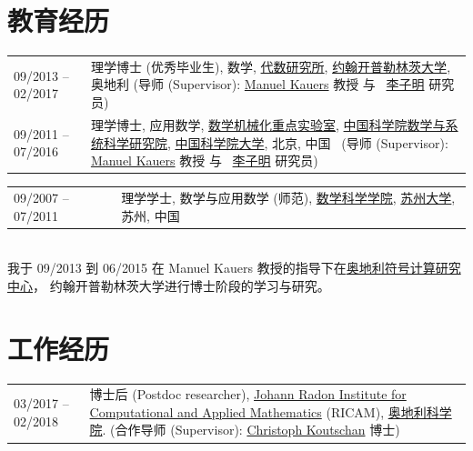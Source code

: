 \documentclass[a4paper,12pt]{article}
\begin{document}
\begin{CJK*}{UTF8}{gbsn}
\section*{\Large{教育经历}}

\vspace{.05in}
\begin{tabular}{@{}p{1.4in}p{4in}}
09/2013 -- 02/2017    & 理学博士 (优秀毕业生), 数学,  
                        \href{http://www.jku.at/algebra/content}{代数研究所}, 
                        \href{http://www.jku.at/content}{约翰开普勒林茨大学}, 奥地利 
                        (导师 (Supervisor): \href{http://www.kauers.de/}{Manuel Kauers} 教授 与  
                         \ \href{http://mmrc.iss.ac.cn/~zmli/}{李子明} 研究员)\\
09/2011 -- 07/2016    & 理学博士,  应用数学, 
                        \href{http://english.mmrc.amss.cas.cn/}{数学机械化重点实验室}, 
                        \href{http://www.amss.ac.cn/}{中国科学院数学与系统科学研究院}, 
                        \href{http://www.gucas.ac.cn/}{中国科学院大学}, 北京, 中国 
                        \ (导师 (Supervisor): \href{http://www.kauers.de/}{Manuel Kauers} 教授 与  
                         \ \href{http://mmrc.iss.ac.cn/~zmli/}{李子明} 研究员)\\
\end{tabular}
\begin{tabular}{@{}p{1.4in}p{4in}}
09/2007 -- 07/2011    & 理学学士, 数学与应用数学 (师范), \href{http://math.suda.edu.cn/}{数学科学学院}, 
                        \href{http://www.suda.edu.cn/}{苏州大学}, 苏州, 中国
\end{tabular} \\

\noindent 我于 09/2013 到 06/2015 在 Manuel Kauers 教授的指导下在\href{http://www.risc.jku.at/}{奥地利符号计算研究中心}， 
约翰开普勒林茨大学进行博士阶段的学习与研究。 

\section*{\Large{工作经历}}

\vspace{.05in}
\begin{tabular}{@{}p{1.4in}p{4in}}
03/2017 -- 02/2018    & 博士后 (Postdoc researcher), 
                        \href{https://www.ricam.oeaw.ac.at/}{Johann Radon Institute for Computational and Applied Mathematics} (RICAM),
                        \href{http://www.oeaw.ac.at/en/austrian-academy-of-sciences/}{奥地利科学院}. 
                        (合作导师 (Supervisor): \href{http://www.koutschan.de/}{Christoph Koutschan} 博士)\\
\end{tabular}


\end{CJK*}
\end{document}
